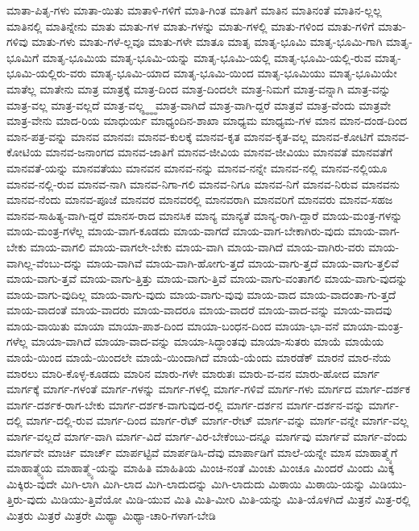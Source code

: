 {ಮಾತಾ-ಪಿತೃ-ಗಳು
ಮಾತಾ-ಯಿತು
ಮಾತಾಳಿ-ಗಳಿಗೆ
ಮಾತಿ-ಗಿಂತ
ಮಾತಿಗೆ
ಮಾತಿನ
ಮಾತಿನಂತೆ
ಮಾತಿನ-ಲ್ಲಲ್ಲ
ಮಾತಿನಲ್ಲಿ
ಮಾತಿನ್ನೇನು
ಮಾತು
ಮಾತು-ಗಳ
ಮಾತು-ಗಳನ್ನು
ಮಾತು-ಗಳಲ್ಲಿ
ಮಾತು-ಗಳಿಂದ
ಮಾತು-ಗಳಿಗೆ
ಮಾತು-ಗಳಿವು
ಮಾತು-ಗಳು
ಮಾತು-ಗಳೆ-ಲ್ಲವೂ
ಮಾತು-ಗಳೇ
ಮಾತೂ
ಮಾತೃ
ಮಾತೃ-ಭೂಮಿ
ಮಾತೃ-ಭೂಮಿ-ಗಾಗಿ
ಮಾತೃ-ಭೂಮಿಗೆ
ಮಾತೃ-ಭೂಮಿಯ
ಮಾತೃ-ಭೂಮಿ-ಯನ್ನು
ಮಾತೃ-ಭೂಮಿ-ಯಲ್ಲಿ
ಮಾತೃ-ಭೂಮಿ-ಯಲ್ಲಿ-ರುವ
ಮಾತೃ-ಭೂಮಿ-ಯಲ್ಲಿರು-ವರು
ಮಾತೃ-ಭೂಮಿ-ಯಾದ
ಮಾತೃ-ಭೂಮಿ-ಯಿಂದ
ಮಾತೃ-ಭೂಮಿಯು
ಮಾತೃ-ಭೂಮಿಯೇ
ಮಾತೆಲ್ಲ
ಮಾತೇನು
ಮಾತ್ರ
ಮಾತ್ರಕ್ಕೆ
ಮಾತ್ರ-ದಿಂದ
ಮಾತ್ರ-ದಿಂದಲೇ
ಮಾತ್ರ-ನಿಮಗೆ
ಮಾತ್ರ-ವನ್ನಾಗಿ
ಮಾತ್ರ-ವನ್ನು
ಮಾತ್ರ-ವಲ್ಲ
ಮಾತ್ರ-ವಲ್ಲದೆ
ಮಾತ್ರ-ವಲ್ಲ್ಧ್ಧ್ಧ್ಧ
ಮಾತ್ರ-ವಾಗಿದೆ
ಮಾತ್ರ-ವಾಗಿ-ದ್ದರೆ
ಮಾತ್ರವೆ
ಮಾತ್ರ-ವೆಂದು
ಮಾತ್ರವೇ
ಮಾತ್ರ-ವೇನು
ಮಾದ-ರಿಯ
ಮಾಧುರ್ಯ
ಮಾಧ್ಯಂದಿನ-ಶಾಖಾ
ಮಾಧ್ಯಮ
ಮಾಧ್ಯಮ-ಗಳ
ಮಾನ
ಮಾನ-ದಂಡ-ದಿಂದ
ಮಾನ-ಪತ್ರ-ವನ್ನು
ಮಾನವ
ಮಾನವಃ
ಮಾನವ-ಕುಲಕ್ಕೆ
ಮಾನವ-ಕೃತ
ಮಾನವ-ಕೃತ-ವಲ್ಲ
ಮಾನವ-ಕೋಟಿಗೆ
ಮಾನವ-ಕೋಟಿಯ
ಮಾನವ-ಜನಾಂಗದ
ಮಾನವ-ಜಾತಿಗೆ
ಮಾನವ-ಜೀವಿಯ
ಮಾನವ-ಜೀವಿಯು
ಮಾನವತೆ
ಮಾನವತೆಗೆ
ಮಾನವತೆ-ಯನ್ನು
ಮಾನವತೆಯು
ಮಾನವನ
ಮಾನವ-ನನ್ನು
ಮಾನವ-ನನ್ನೇ
ಮಾನವ-ನಲ್ಲಿ
ಮಾನವ-ನಲ್ಲಿಯೂ
ಮಾನವ-ನಲ್ಲಿ-ರುವ
ಮಾನವ-ನಾಗಿ
ಮಾನವ-ನಿಗಾ-ಗಲಿ
ಮಾನವ-ನಿಗೂ
ಮಾನವ-ನಿಗೆ
ಮಾನವ-ನಿರುವ
ಮಾನವನು
ಮಾನವ-ನೆಂದು
ಮಾನವ-ಪೂಜೆ
ಮಾನವರ
ಮಾನವರಲ್ಲಿ
ಮಾನವರಾಗಿ
ಮಾನವರಿಗೆ
ಮಾನವರು
ಮಾನವ-ಸಹಜ
ಮಾನವ-ಸಾಹಿತ್ಯ-ವಾಗಿ-ದ್ದರೆ
ಮಾನಸ-ರಾದ
ಮಾನಸಿಕ
ಮಾನ್ಯ
ಮಾನ್ಯತೆ
ಮಾನ್ಯ-ರಾಗಿ-ದ್ದಾರೆ
ಮಾಯ-ಮಂತ್ರ-ಗಳನ್ನು
ಮಾಯ-ಮಂತ್ರ-ಗಳೆಲ್ಲ
ಮಾಯ-ವಾಗ-ಕೂಡದು
ಮಾಯ-ವಾಗದೆ
ಮಾಯ-ವಾಗ-ಬೇಕಾಗಿರು-ವುದು
ಮಾಯ-ವಾಗ-ಬೇಕು
ಮಾಯ-ವಾಗಲಿ
ಮಾಯ-ವಾಗಲೇ-ಬೇಕು
ಮಾಯ-ವಾಗಿ
ಮಾಯ-ವಾಗಿದೆ
ಮಾಯ-ವಾಗಿರು-ವರು
ಮಾಯ-ವಾಗಿಲ್ಲ-ವೆಂಬು-ದನ್ನು
ಮಾಯ-ವಾಗಿವೆ
ಮಾಯ-ವಾಗಿ-ಹೋಗು-ತ್ತದೆ
ಮಾಯ-ವಾಗು-ತ್ತದೆ
ಮಾಯ-ವಾಗು-ತ್ತಲಿವೆ
ಮಾಯ-ವಾಗು-ತ್ತವೆ
ಮಾಯ-ವಾಗು-ತ್ತಿತ್ತು
ಮಾಯ-ವಾಗು-ತ್ತಿವೆ
ಮಾಯ-ವಾಗು-ವಂತಾಗಲಿ
ಮಾಯ-ವಾಗು-ವುದನ್ನು
ಮಾಯ-ವಾಗು-ವುದಿಲ್ಲ
ಮಾಯ-ವಾಗು-ವುದು
ಮಾಯ-ವಾಗು-ವುವು
ಮಾಯ-ವಾದ
ಮಾಯ-ವಾದಂತಾ-ಗು-ತ್ತದೆ
ಮಾಯ-ವಾದಂತೆ
ಮಾಯ-ವಾದರು
ಮಾಯ-ವಾದರೂ
ಮಾಯ-ವಾದರೆ
ಮಾಯ-ವಾದ-ವನ್ನು
ಮಾಯ-ವಾದವು
ಮಾಯ-ವಾಯಿತು
ಮಾಯಾ
ಮಾಯಾ-ಪಾಶ-ದಿಂದ
ಮಾಯಾ-ಬಂಧನ-ದಿಂದ
ಮಾಯಾ-ಭಾ-ವನೆ
ಮಾಯಾ-ಮಂತ್ರ-ಗಳೆಲ್ಲ
ಮಾಯಾ-ವಾಗಿದೆ
ಮಾಯಾ-ವಾದ-ವನ್ನು
ಮಾಯಾ-ಸಿದ್ಧಾಂತವು
ಮಾಯಾ-ಸುತರು
ಮಾಯೆ
ಮಾಯೆಯ
ಮಾಯೆ-ಯಿಂದ
ಮಾಯೆ-ಯಿಂದಲೇ
ಮಾಯೆ-ಯಿಂದಾಗಿದೆ
ಮಾಯೆ-ಯೆಂದು
ಮಾರಡೆಕ್
ಮಾರನೆ
ಮಾರ-ನೆಯ
ಮಾರಲು
ಮಾರಿ-ಕೊಳ್ಳ-ಕೂಡದು
ಮಾರಿನ
ಮಾರು-ಗಳೇ
ಮಾರುತಃ
ಮಾರು-ವ-ವನ
ಮಾರು-ಹೋದ
ಮಾರ್ಗ
ಮಾರ್ಗಕ್ಕೆ
ಮಾರ್ಗ-ಗಳಂತೆ
ಮಾರ್ಗ-ಗಳನ್ನು
ಮಾರ್ಗ-ಗಳಲ್ಲಿ
ಮಾರ್ಗ-ಗಳಿವೆ
ಮಾರ್ಗ-ಗಳು
ಮಾರ್ಗದ
ಮಾರ್ಗ-ದರ್ಶಕ
ಮಾರ್ಗ-ದರ್ಶಕ-ರಾಗ-ಬೇಕು
ಮಾರ್ಗ-ದರ್ಶಕ-ವಾಗುವುದ-ರಲ್ಲಿ
ಮಾರ್ಗ-ದರ್ಶನ
ಮಾರ್ಗ-ದರ್ಶನ-ವನ್ನು
ಮಾರ್ಗ-ದಲ್ಲಿ
ಮಾರ್ಗ-ದಲ್ಲಿ-ರುವ
ಮಾರ್ಗ-ದಿಂದ
ಮಾರ್ಗ-ರೆಟ್
ಮಾರ್ಗ-ರೇಟ್
ಮಾರ್ಗ-ವನ್ನು
ಮಾರ್ಗ-ವನ್ನೇ
ಮಾರ್ಗ-ವಲ್ಲ
ಮಾರ್ಗ-ವಲ್ಲದೆ
ಮಾರ್ಗ-ವಾಗಿ
ಮಾರ್ಗ-ವಿದೆ
ಮಾರ್ಗ-ವಿರ-ಬೇಕೆಂಬು-ದನ್ನೂ
ಮಾರ್ಗವು
ಮಾರ್ಗವೆ
ಮಾರ್ಗ-ವೆಂದು
ಮಾರ್ಗವೇ
ಮಾರ್ಚಿ
ಮಾರ್ಚ್
ಮಾರ್ಪಟ್ಟಿವೆ
ಮಾರ್ಪಡಿಸಿ-ದೆವು
ಮಾರ್ಪಾಡಿಗೆ
ಮಾಲೆ-ಯನ್ನೇ
ಮಾಸ
ಮಾಹಾತ್ಮ್ಯೆಗೆ
ಮಾಹಾತ್ಮ್ಯೆಯ
ಮಾಹಾತ್ಮ್ಯೆ-ಯನ್ನು
ಮಾಹಿತಿ
ಮಾಹಿತಿಯ
ಮಿಂಚಿ-ನಂತೆ
ಮಿಂಚು
ಮಿಂಚೂ
ಮಿಂದರೆ
ಮಿಂದು
ಮಿಕ್ಕ
ಮಿಕ್ಕಿರು-ವುದೇ
ಮಿಗಿ-ಲಾಗಿ
ಮಿಗಿ-ಲಾದ
ಮಿಗಿ-ಲಾದುದನ್ನು
ಮಿಗಿ-ಲಾದುದು
ಮಿಠಾಯಿ
ಮಿಠಾಯಿ-ಯನ್ನು
ಮಿಡಿಯು-ತ್ತಿರು-ವುದು
ಮಿಡಿಯು-ತ್ತಿವೆಯೋ
ಮಿಡಿ-ಯುವ
ಮಿತಿ
ಮಿತಿ-ಮೀರಿ
ಮಿತಿ-ಯನ್ನು
ಮಿತಿ-ಯೊಳಗಿದೆ
ಮಿತ್ರನೆ
ಮಿತ್ರ-ರಲ್ಲಿ
ಮಿತ್ರರು
ಮಿತ್ರರೆ
ಮಿತ್ರರೇ
ಮಿಥ್ಯಾ
ಮಿಥ್ಯಾ-ಚಾರಿ-ಗಳಾಗ-ಬೇಡಿ
}
